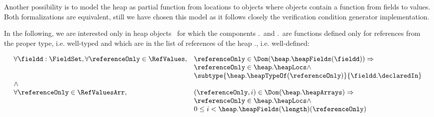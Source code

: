  Another possibility is to model the heap as partial function from locations to objects where objects contain a function from 
 fields to values. Both formalizations are equivalent, still we have chosen this model as it follows closely the
 verification condition generator implementation.

 In the following, we are interested only in  heap objects \heap \ for which the components
 \heap.\heapFields \ and \heap.\heapArrays \ are functions defined only for references from the proper
 type, i.e. well-typed and which are in the list of references of the heap \heap.\heapLocs, i.e. well-defined: 

 $$\begin{array}{ll}
          \forall  \fieldd : \FieldSet, \forall \referenceOnly \in \RefValues, &  \referenceOnly \in \Dom( \heap.\heapFields(\fieldd)) \Rightarrow \\
	  &  \referenceOnly  \in \heap.\heapLocs  \wedge \\
	  & \subtype{ \heap.\heapTypeOf(\referenceOnly ) }{\fieldd.\declaredIn} \\
	  \wedge &  \\
	  \forall \referenceOnly \in  \RefValuesArr, &  (\referenceOnly  , i ) \in \Dom (\heap.\heapArrays) \Rightarrow \\
	  &  \referenceOnly  \in  \heap.\heapLocs \wedge \\
	  & 0 \leq i < \heap.\heapFields( \length)( \referenceOnly)  
	 
   \end{array}
  $$


 



